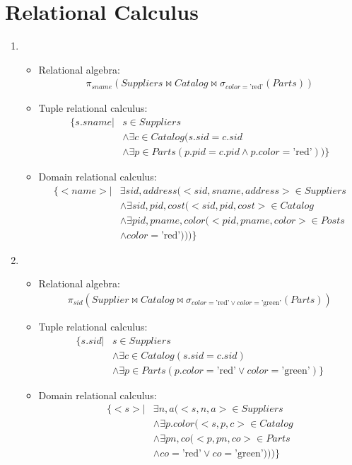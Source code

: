 \section{Relational Calculus}
{
\newcommand{\solution}[3]{
\item
\begin{itemize}
\item Relational algebra:\begin{align*}#1\end{align*}
\item Tuple relational calculus: \begin{align*}#2\end{align*}
\item Domain relational calculus: \begin{align*}#3\end{align*}
\end{itemize}}
\begin{enumerate}
\solution
{
\pi_{sname}(Suppliers \Join Catalog \Join \sigma_{color=\text{'red'}}(Parts))
}
{
\{s.sname | & s \in Suppliers \\
&\wedge \exists c \in Catalog(s.sid = c.sid\\
&\wedge \exists p \in Parts(p.pid = c.pid \wedge p.color = \text{'red'}) ) \}
}
{
\{<name> | &\exists sid,address(<sid, sname, address> \in Suppliers\\
&\wedge \exists sid,pid,cost(<sid,pid, cost> \in Catalog\\
&\wedge \exists pid, pname, color(<pid,pname,color> \in Posts\\
&\wedge color=\text{'red'}
))) \}
}

\solution
{\pi_{sid}(Supplier \Join Catalog \Join \sigma_{color=\text{'red'} \vee color=\text{'green'}}(Parts))}
{\{
s.sid | & s \in Suppliers\\
&\wedge \exists c \in Catalog(s.sid = c.sid)\\
&\wedge \exists p \in Parts(p.color=\text{'red'} \vee color=\text{'green'})
\}}
{\{
<s> | & \exists n,a (<s,n,a> \in Suppliers\\
&\wedge \exists p.color(<s,p,c> \in Catalog\\
&\wedge \exists pn,co(<p,pn,co> \in Parts\\
&\wedge co=\text{'red'} \vee co=\text{'green'})))
\}}
\end{enumerate}
}
